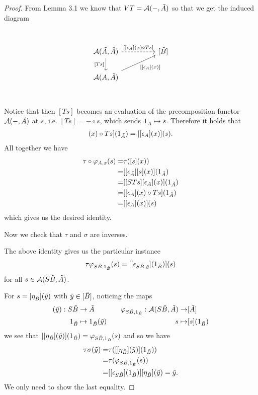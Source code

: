 \documentclass[12pt,a4paper]{article}
\def\HomA{\ensuremath\mathcal{A}}
\def\t{\ensuremath\tilde}
\begin{document}
\begin{proof}
From Lemma 3.1 we know that $VT = \HomA(-, \t A)$ so that we get the induced diagram
\[\begin{tikzcd}
	&& {} \\
	{\HomA(\t A, \t A)} && {[\t B]} \\
	{\HomA(A, \t A)}\\
	\arrow["{[[\epsilon_A](x)\circ Ts]}", dashed, from=2-1, to=2-3]
	\arrow["\text{[$Ts$]}"', from=2-1, to=3-1]
	\arrow["{[[\epsilon_A](x)]}"', from=3-1, to=2-3]
\end{tikzcd}\]
Notice that then $[Ts]$ becomes an evaluation of the precomposition functor $\HomA(-, \t A)$ at $s$, i.e. $[Ts] = - \circ s$, which sends $1_{\t A} \mapsto s$. Therefore it holds that \begin{align*}
 	[[\epsilon_A](x)\circ Ts](1_{\t A})=[[\epsilon_A](x)](s).
 \end{align*}
 All together we have \begin{align*}
 	\tau \circ \varphi_{A,x}(s)= &\tau([s](x))\\
 	=&[[\epsilon_{\t A}][s](x)](1_{\t A})\\
 	 =& [[STs][\epsilon_A](x)](1_{\t A})
 	\\=&[[\epsilon_A](x)\circ Ts](1_{\t A})\\
 	=&[[\epsilon_A](x)](s)
 \end{align*}
 which gives us the desired identity.
 
 Now we check that $\tau$ and $\sigma$ are inverses. 
 
 The above identity gives us the particular instance \begin{align*}
 	\tau \varphi_{S\t B, 1_{\t B}}(s) = [[\epsilon_{S\t B,\t y}](1_{\t B})](s)
 \end{align*}
 for all $s \in \HomA(S\t B, \t A)$.
 
 For $s = [\eta_{\t B}](\t y)$ with $\t y \in [\t B]$, noticing the maps \begin{align*}
 	[\eta_{\t B}](\t y): S\t B &\to \t A & \ \ \ \varphi_{S\t B, 1_{\t B}}: \HomA(S\t B, \t A) \to & [\t A]\\
 	1_{\t B} &\mapsto 1_{\t B}(\t y)& s \mapsto& [s](1_{\t B})
 \end{align*}
 we see that $[[\eta_{\t B}](\t y)](1_{\t B}) = \varphi_{S \t B, 1_{\t B}}(s)$ and so we  have \begin{align*}
 	\tau \sigma (\t y) =& \tau ( [[\eta_{\t B}](\t y)](1_{\t B}))\\
 	 =&  \tau(\varphi_{S\t B, 1_{\t B}}(s))\\
 	 =& [[\epsilon_{S\t B}](1_{\t B})][\eta_{\t B}](\t y) = \t y.
 \end{align*}
 We only need to show the last equality. 
 

\end{proof}
\end{document}
